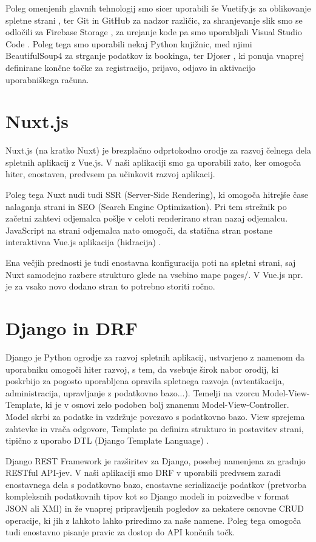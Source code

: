 \documentclass[a4paper,12pt,openright]{book}
\begin{document}
Poleg omenjenih glavnih tehnologij smo sicer uporabili še Vuetify.js za oblikovanje spletne strani \cite{vuetify},
ter Git \cite{git} in GitHub \cite{github} za nadzor različic, za shranjevanje slik smo se odločili za Firebase Storage \cite{firebase}, za urejanje kode pa 
smo uporabljali Visual Studio Code \cite{vscode}. Poleg tega smo uporabili nekaj Python knjižnic, med njimi BeautifulSoup4 \cite{bs4} za strganje podatkov iz bookinga,
ter Djoser \cite{djoser}, ki ponuja vnaprej definirane končne točke za registracijo, prijavo, odjavo in aktivacijo uporabniškega računa. 

\section{Nuxt.js}
Nuxt.js (na kratko Nuxt) je brezplačno odprtokodno orodje za razvoj čelnega dela spletnih aplikacij z Vue.js. V naši aplikaciji smo ga uporabili zato, ker 
omogoča hiter, enostaven, predvsem pa učinkovit razvoj aplikacij. 

Poleg tega Nuxt nudi tudi SSR (Server-Side Rendering), ki omogoča hitrejše čase nalaganja strani in SEO (Search Engine Optimization). Pri tem strežnik po začetni zahtevi odjemalca 
pošlje v celoti renderirano stran nazaj odjemalcu. JavaScript na strani odjemalca nato omogoči, da statična stran postane interaktivna Vue.js aplikacija (hidracija) \cite{hydration}.

Ena večjih prednosti je tudi enostavna konfiguracija poti na spletni strani, saj Nuxt samodejno razbere strukturo glede na vsebino mape pages/. 
V Vue.js npr. je za vsako novo dodano stran to potrebno storiti ročno.

\section{Django in DRF}
Django je Python ogrodje za razvoj spletnih aplikacij, ustvarjeno z namenom da uporabniku omogoči hiter razvoj, s tem, da vsebuje širok nabor orodij,
ki poskrbijo za pogosto uporabljena opravila spletnega razvoja (avtentikacija, administracija, upravljanje z podatkovno bazo...).
Temelji na vzorcu Model-View-Template, ki je v osnovi zelo podoben bolj znanemu Model-View-Controller. Model skrbi za podatke in vzdržuje povezavo s podatkovno bazo.
View sprejema zahtevke in vrača odgovore, Template pa definira strukturo in postavitev strani, tipično z uporabo DTL (Django Template Language) \cite{mvt}.

Django REST Framework je razširitev za Django, posebej namenjena za gradnjo RESTful API-jev. V naši aplikaciji smo DRF v uporabili predvsem zaradi 
enostavnega dela s podatkovno bazo, enostavne serializacije podatkov (pretvorba kompleksnih podatkovnih tipov kot so Django modeli in poizvedbe v
format JSON ali XMl) in že vnaprej pripravljenih pogledov za nekatere osnovne CRUD operacije, 
ki jih z lahkoto lahko priredimo za naše namene. Poleg tega omogoča tudi enostavno pisanje pravic za dostop do API končnih točk.
\end{document}
